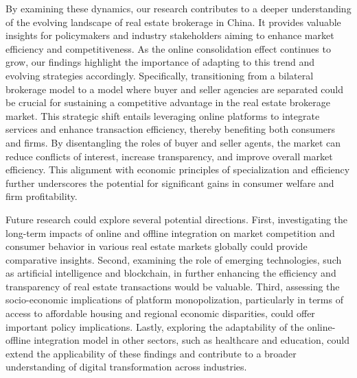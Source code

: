 \documentclass[11pt]{article}
\begin{document}
By examining these dynamics, our research contributes to a deeper understanding of the evolving landscape of real estate brokerage in China. It provides valuable insights for policymakers and industry stakeholders aiming to enhance market efficiency and competitiveness. As the online consolidation effect continues to grow, our findings highlight the importance of adapting to this trend and evolving strategies accordingly. Specifically, transitioning from a bilateral brokerage model to a model where buyer and seller agencies are separated could be crucial for sustaining a competitive advantage in the real estate brokerage market. This strategic shift entails leveraging online platforms to integrate services and enhance transaction efficiency, thereby benefiting both consumers and firms. By disentangling the roles of buyer and seller agents, the market can reduce conflicts of interest, increase transparency, and improve overall market efficiency. This alignment with economic principles of specialization and efficiency further underscores the potential for significant gains in consumer welfare and firm profitability.

Future research could explore several potential directions. First, investigating the long-term impacts of online and offline integration on market competition and consumer behavior in various real estate markets globally could provide comparative insights. Second, examining the role of emerging technologies, such as artificial intelligence and blockchain, in further enhancing the efficiency and transparency of real estate transactions would be valuable. Third, assessing the socio-economic implications of platform monopolization, particularly in terms of access to affordable housing and regional economic disparities, could offer important policy implications. Lastly, exploring the adaptability of the online-offline integration model in other sectors, such as healthcare and education, could extend the applicability of these findings and contribute to a broader understanding of digital transformation across industries.

\end{document}
